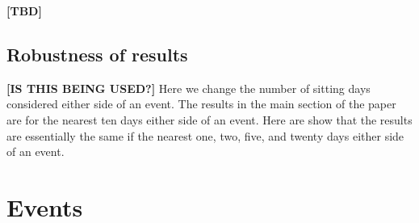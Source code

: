 \documentclass[12pt,]{article}
\theoremstyle{definition}
\theoremstyle{definition}
\theoremstyle{definition}
\theoremstyle{remark}
\begin{document}
\textbf{{[}TBD{]}}

\subsection{Robustness of results}\label{robustness-of-results}

\textbf{{[}IS THIS BEING USED?{]}} Here we change the number of sitting
days considered either side of an event. The results in the main section
of the paper are for the nearest ten days either side of an event. Here
are show that the results are essentially the same if the nearest one,
two, five, and twenty days either side of an event.

\newpage

\section{Events}\label{eventdetails}
\end{document}

